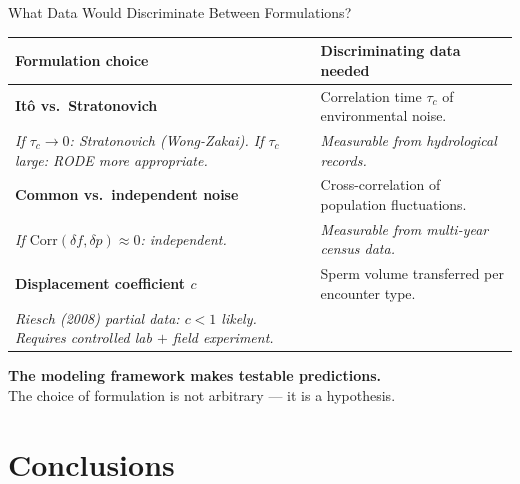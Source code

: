 \documentclass{beamer}
\begin{document}
\begin{frame}{What Data Would Discriminate Between Formulations?}
  \footnotesize

  \begin{tabular}{p{4.8cm}p{5.5cm}}
    \toprule
    \textbf{Formulation choice} & \textbf{Discriminating data needed} \\
    \midrule
    \textbf{It\^{o} vs.\ Stratonovich} &
      Correlation time $\tau_c$ of environmental noise. \\
    \textit{If $\tau_c \to 0$: Stratonovich (Wong-Zakai).
      If $\tau_c$ large: RODE more appropriate.} &
      \textit{Measurable from hydrological records.} \\
    \midrule
    \textbf{Common vs.\ independent noise} &
      Cross-correlation of population fluctuations. \\
    \textit{If $\mathrm{Corr}(\delta f, \delta p) \approx 0$: independent.} &
      \textit{Measurable from multi-year census data.} \\
    \midrule
    \textbf{Displacement coefficient $c$} &
      Sperm volume transferred per encounter type. \\
    \textit{Riesch (2008) partial data: $c < 1$ likely.
      Requires controlled lab $+$ field experiment.} &
      \\
    \bottomrule
  \end{tabular}

  \vspace{0.3cm}
  \textbf{The modeling framework makes testable predictions.}\\
  The choice of formulation is not arbitrary --- it is a hypothesis.

\end{frame}

\section{Conclusions}
\end{document}
